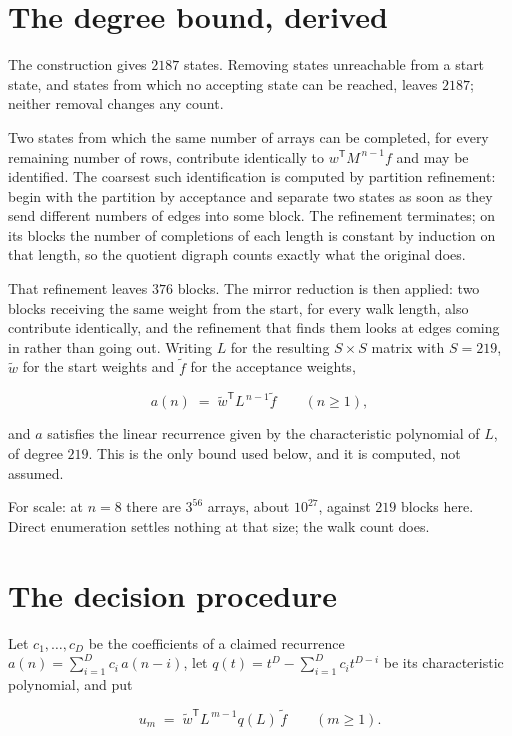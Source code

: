\documentclass[11pt]{article}
\theoremstyle{definition}
\begin{document}
\section{The degree bound, derived}

The construction gives $2187$ states. Removing states unreachable from a start state, and states from which no accepting state can be reached, leaves $2187$; neither removal changes any count.

Two states from which the same number of arrays can be completed, for every remaining number of rows, contribute identically to $w^{\mathsf T}M^{\,n-1}f$ and may be identified. The coarsest such identification is computed by partition refinement: begin with the partition by acceptance and separate two states as soon as they send different numbers of edges into some block. The refinement terminates; on its blocks the number of completions of each length is constant by induction on that length, so the quotient digraph counts exactly what the original does.

That refinement leaves $376$ blocks. The mirror reduction is then applied: two blocks receiving the same weight from the start, for every walk length, also contribute identically, and the refinement that finds them looks at edges coming in rather than going out. Writing $L$ for the resulting $S \times S$ matrix with $S = 219$, $\tilde w$ for the start weights and $\tilde f$ for the acceptance weights,

\[a(n) \;=\; \tilde w^{\mathsf T} L^{\,n-1} \tilde f \qquad (n \ge 1),\]

and $a$ satisfies the linear recurrence given by the characteristic polynomial of $L$, of degree $219$. This is the only bound used below, and it is computed, not assumed.

For scale: at $n = 8$ there are $3^{56}$ arrays, about $10^{27}$, against $219$ blocks here. Direct enumeration settles nothing at that size; the walk count does.

\section{The decision procedure}

Let $c_1,\dots,c_D$ be the coefficients of a claimed recurrence $a(n) = \sum_{i=1}^{D} c_i\,a(n-i)$, let $q(t) = t^{D} - \sum_{i=1}^{D} c_i t^{D-i}$ be its characteristic polynomial, and put

\[u_m \;=\; \tilde w^{\mathsf T} L^{\,m-1} q(L)\,\tilde f \qquad (m \ge 1).\]
\end{document}
